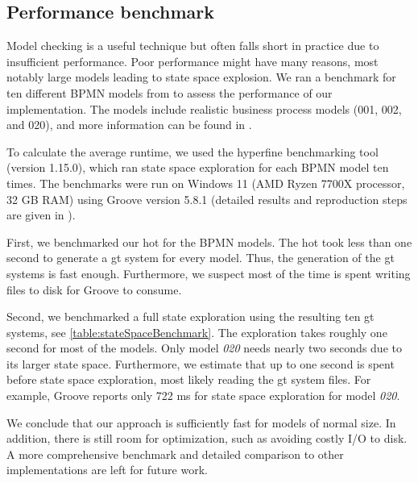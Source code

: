 \documentclass[runningheads]{llncs}
\begin{document}
\subsection{Performance benchmark}

Model checking is a useful technique but often falls short in practice due to insufficient performance.
Poor performance might have many reasons, most notably large models leading to state space explosion.
We ran a benchmark for ten different BPMN models from \cite{houhouFirstOrderLogicVerification2022} to assess the performance of our implementation.
The models include realistic business process models (001, 002, and 020), and more information can be found in \cite{houhouFirstOrderLogicVerification2022}.

To calculate the average runtime, we used the hyperfine benchmarking tool \cite{peterHyperfine2022} (version 1.15.0), which ran state space exploration for each BPMN model ten times.
The benchmarks were run on Windows 11 (AMD Ryzen 7700X processor, 32 GB RAM) using Groove version 5.8.1 (detailed results and reproduction steps are given in \cite{krauterArtifactsICGT2023}). 

First, we benchmarked our \gls*{hot} for the BPMN models.
The \gls*{hot} took less than one second to generate a \gls*{gt} system for every model.
Thus, the generation of the \gls*{gt} systems is fast enough.
Furthermore, we suspect most of the time is spent writing files to disk for Groove to consume.

Second, we benchmarked a full state exploration using the resulting ten \gls*{gt} systems, see \autoref{table:stateSpaceBenchmark}.
The exploration takes roughly one second for most of the models.
Only model \textit{020} needs nearly two seconds due to its larger state space.
Furthermore, we estimate that up to one second is spent before state space exploration, most likely reading the \gls*{gt} system files.
For example, Groove reports only 722 ms for state space exploration for model \textit{020}.

We conclude that our approach is sufficiently fast for models of normal size.
In addition, there is still room for optimization, such as avoiding costly I/O to disk.
A more comprehensive benchmark and detailed comparison to other implementations are left for future work.
\end{document}
